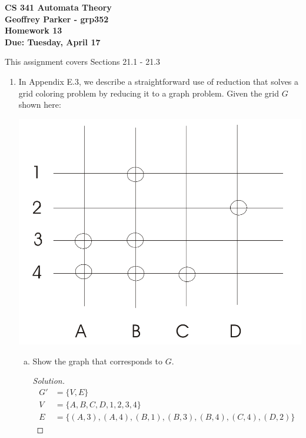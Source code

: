 \documentclass[10pt]{article}
\begin{document}
\begin{flushleft}
\textbf{\noindent
CS 341 Automata Theory \\
Geoffrey Parker - grp352\\
Homework 13 \\
Due: Tuesday, April 17}\\
\end{flushleft}

\noindent
This assignment covers Sections 21.1 - 21.3\\

\begin{enumerate}[1)]


\item
In Appendix E.3, we describe a straightforward use of reduction that solves a grid coloring problem by reducing it to a graph problem.  Given the grid $G$ shown here:
\begin{center}
\includegraphics[scale=.15]{images/p1.png}
\end{center}
\begin{enumerate}[a)]

\item
Show the graph that corresponds to $G$.
\begin{proof}[Solution]
\begin{align*}
G' &= \{V, E\}\\
V &= \{A, B, C, D, 1, 2, 3, 4\}\\
E &= \{(A, 3), (A, 4), (B, 1), (B, 3), (B, 4), (C, 4), (D, 2)\}
\end{align*}
\end{proof}


\end{enumerate}
\end{enumerate}
\end{document}
